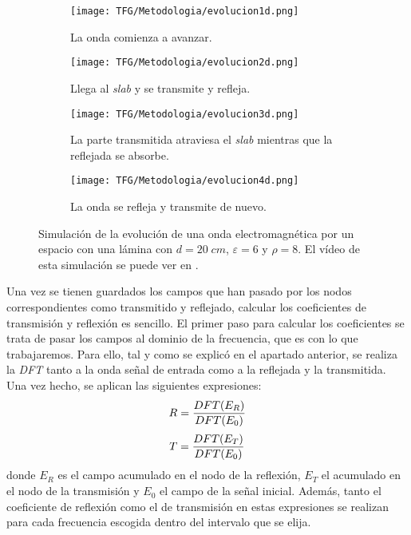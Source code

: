 \documentclass[11pt,a4paper,twoside,pdf]{article}
\numberwithin{equation}{section}
\begin{document}
\begin{figure}[H]
    \centering
    \begin{subfigure}[b]{0.45\textwidth}
        \centering
        \texttt{[image: TFG/Metodologia/evolucion1d.png]}
        \caption{La onda comienza a avanzar.}
        \label{f:gato}
    \end{subfigure}
    \hfill
    \begin{subfigure}[b]{0.45\textwidth}
        \centering
        \texttt{[image: TFG/Metodologia/evolucion2d.png]}
        \caption{Llega al \textit{slab} y se transmite y refleja.}
        \label{f:tigre}
    \end{subfigure}
    \begin{subfigure}[b]{0.45\textwidth}
        \centering
        \texttt{[image: TFG/Metodologia/evolucion3d.png]}
        \caption{La parte transmitida atraviesa el \textit{slab} mientras que la reflejada se absorbe.}
        \label{f:gato}
    \end{subfigure}
    \hfill
    \begin{subfigure}[b]{0.45\textwidth}
        \centering
        \texttt{[image: TFG/Metodologia/evolucion4d.png]}
        \caption{La onda se refleja y transmite de nuevo.\\}
        \label{f:tigre}
    \end{subfigure}
    \caption{Simulación de la evolución de una onda electromagnética por un espacio con una lámina con $d=20\;cm$, $\varepsilon=6$ y $\rho=8$. El vídeo de esta simulación se puede ver en \cite{youtube}.}
    \label{fig5}
\end{figure}

Una vez se tienen guardados los campos que han pasado por los nodos correspondientes como transmitido y reflejado, calcular los coeficientes de transmisión y reflexión es sencillo. El primer paso para calcular los coeficientes se trata de pasar los campos al dominio de la frecuencia, que es con lo que trabajaremos. Para ello, tal y como se explicó en el apartado anterior, se realiza la \textit{DFT} tanto a la onda señal de entrada como a la reflejada y la transmitida. Una vez hecho, se aplican las siguientes expresiones:
\begin{equation}
    R=\frac{DFT(E_R)}{DFT(E_0)} \notag
\end{equation}
\begin{equation}
    T=\frac{DFT(E_T)}{DFT(E_0)} \notag
\end{equation}
donde $E_R$ es el campo acumulado en el nodo de la reflexión, $E_T$ el acumulado en el nodo de la transmisión y $E_0$ el campo de la señal inicial. Además, tanto el coeficiente de reflexión como el de transmisión en estas expresiones se realizan para cada frecuencia escogida dentro del intervalo que se elija.
\newpage
\end{document}

